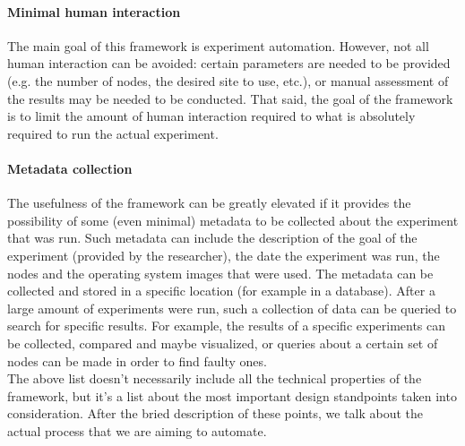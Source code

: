 \paragraph{Minimal human interaction}
The main goal of this framework is experiment automation. However,
not all human interaction can be avoided: certain parameters are
needed to be provided (e.g. the number of nodes, the desired site to
use, etc.), or manual assessment of the results may be needed to be
conducted. That said, the goal of the framework is to limit the
amount of human interaction required to what is absolutely required to
run the actual experiment.
\paragraph{Metadata collection}
The usefulness of the framework can be greatly elevated if it provides
the possibility of some (even minimal) metadata to be collected about
the experiment that was run. Such metadata can include the description
of the goal of the experiment (provided by the researcher), the date
the experiment was run, the nodes and the operating system images that
were used. The metadata can be collected and stored in a specific
location (for example in a database). After a large amount of
experiments were run, such a collection of data can be queried to
search for specific results. For example, the results of a specific
experiments can be collected, compared and maybe visualized, or
queries about a certain set of nodes can be made in order to find
faulty ones.\\
The above list doesn't necessarily include all the technical
properties of the framework, but it's a list about the most important
design standpoints taken into consideration. After the bried
description of these points, we talk about the actual process that we
are aiming to automate.
